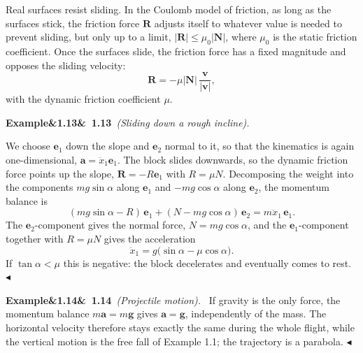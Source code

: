 \documentclass[11pt,a4paper,oneside]{report}
\numberwithin{equation}{chapter}
\newcommand{\vect}[1]{\bm{#1}}
\newcommand{\e}[1]{\vect{e}_{#1}}
\theoremstyle{plain}
\theoremstyle{definition}
\theoremstyle{remark}
\newenvironment{example}[2]{%
  \par\addvspace{\bigskipamount}\noindent
  \textbf{Example\ifx&#1&\else~#1\fi}\ \textit{(#2).}\ \ignorespaces}%
  {\hfill$\blacktriangleleft$\par\addvspace{\bigskipamount}}
\begin{document}
Real surfaces resist sliding. In the Coulomb model of friction, as long as the surfaces stick, the friction force
$\vect R$ adjusts itself to whatever value is needed to prevent sliding, but only up to a limit,
$|\vect R|\le\mu_0|\vect N|$, where $\mu_0$ is the static friction coefficient. Once the surfaces slide, the
friction force has a fixed magnitude and opposes the sliding velocity:
\begin{equation}
  \vect R=-\mu|\vect N|\,\frac{\vect v}{|\vect v|},
\end{equation}
with the dynamic friction coefficient $\mu$.

\begin{example}{1.13}{Sliding down a rough incline}
\begin{center}
\end{center}
We choose $\e1$ down the slope and $\e2$ normal to it, so that the kinematics is again one-dimensional,
$\vect a=\ddot x_1\e1$. The block slides downwards, so the dynamic friction force points up the slope,
$\vect R=-R\e1$ with $R=\mu N$. Decomposing the weight into the components $mg\sin\alpha$ along $\e1$ and
$-mg\cos\alpha$ along $\e2$, the momentum balance is
\[
  (mg\sin\alpha-R)\,\e1+(N-mg\cos\alpha)\,\e2=m\ddot x_1\,\e1 .
\]
The $\e2$-component gives the normal force, $N=mg\cos\alpha$, and the $\e1$-component together with $R=\mu N$
gives the acceleration
\[
  \ddot x_1=g\big(\sin\alpha-\mu\cos\alpha\big).
\]
If $\tan\alpha<\mu$ this is negative: the block decelerates and eventually comes to rest.
\end{example}

\begin{example}{1.14}{Projectile motion}
If gravity is the only force, the momentum balance $m\vect a=m\vect g$ gives $\vect a=\vect g$, independently of
the mass. The horizontal velocity therefore stays exactly the same during the whole flight, while the vertical
motion is the free fall of Example 1.1; the trajectory is a parabola.
\end{example}
\end{document}
